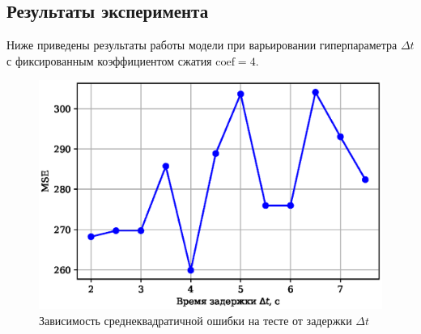\documentclass[12pt,twoside]{article}
\begin{document}
\subsection{Результаты эксперимента}
Ниже приведены результаты работы модели при варьировании гиперпараметра $\Delta t$ с фиксированным коэффициентом сжатия $\mathrm{coef} = 4$. 
\begin{figure}[h!]
    \centering
    \includegraphics[scale = 0.8]{MSE_dt.eps}
    \caption{Зависимость среднеквадратичной ошибки на тесте от задержки ${\Delta t}$}
    \label{MSE_dt}
\end{figure}
\end{document}
